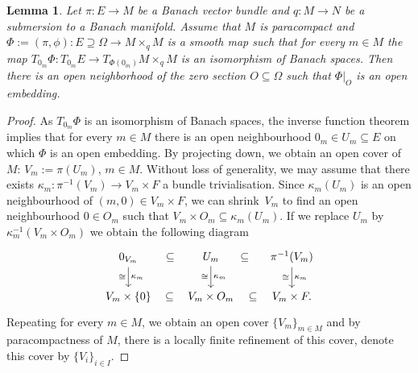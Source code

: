 \documentclass[pdftex]{sigma}
\numberwithin{equation}{section}
\newtheorem{Lemma}[Theorem]{Lemma}
\begin{document}
\begin{Lemma}\label{lem:loc2glob_emb}
Let $\pi \colon E\rightarrow M$ be a Banach vector bundle and $q \colon M \rightarrow N$ be a submersion to a Banach manifold. Assume that $M$ is paracompact and $\Phi := (\pi,\phi) \colon E \supseteq \Omega \rightarrow M \times_q M$ is a smooth map such that for every $m\in M$ the map $T_{0_m} \Phi \colon T_{0_m}E \rightarrow T_{\Phi(0_m)}M \times_q M$ is an isomorphism of Banach spaces. Then there is an open neighborhood of the zero section $O\subseteq \Omega$ such that $\Phi|_O$ is an open embedding.
\end{Lemma}
\begin{proof}
As $T_{0_m}\Phi$ is an isomorphism of Banach spaces, the inverse function theorem implies that for every $m \in M$ there is an open neighbourhood $0_m \in U_{m} \subseteq E$ on which $\Phi$ is an open embedding.
By projecting down, we obtain an open cover of $M$:
$V_{m} := \pi(U_{m})$, $m \in M$.
Without loss of generality, we may assume that there exists $\kappa_m \colon \pi^{-1}(V_{m}) \rightarrow V_m \times F$ a bundle trivialisation.
Since $\kappa_{m}(U_{m})$ is an open neighbourhood of $(m,0) \in V_{m} \times F$, we can shrink~$V_{m}$ to find an open neighbourhood $0 \in O_{m}$ such that $V_{m} \times O_{m} \subseteq \kappa_{m}(U_{m})$.
If we replace $U_{m}$ by~$\kappa_{m}^{-1}(V_{m} \times O_{m})$ we obtain the following diagram
\begin{equation*}
 \begin{tikzcd}
 0_{V_{m}} \arrow[r, phantom, sloped, "\subseteq"] \ar[d,"\kappa_{m}", "\cong"'] & U_{m} \arrow[r, phantom, sloped, "\subseteq"] \ar[d,"\kappa_{m}", "\cong"'] & \pi^{-1}(V_{m}) \ar[d,"\kappa_{m}", "\cong"'] \\
 V_{m} \times \{ 0 \} \arrow[r, phantom, sloped, "\subseteq"] & V_{m} \times O_{m} \arrow[r, phantom, sloped, "\subseteq"] & V_{m} \times F.
 \end{tikzcd}
\end{equation*}
Repeating for every $m \in M$, we obtain an open cover $\{ V_{m} \}_{m \in M}$ and by paracompactness of $M$, there is a locally finite refinement of this cover, denote this cover by $\{V_i\}_{i\in I}$.


\end{proof}
\end{document}
